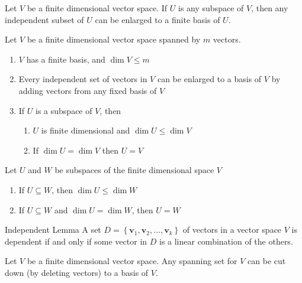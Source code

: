 \documentclass[12pt]{article}
\begin{document}
\begin{lemma}{}{}
    Let $ V $ be a finite dimensional vector space. If $ U $ is any subspace of $ V $, then any independent subset of $ U $ can be enlarged to a finite basis of $ U $.
\end{lemma}

\begin{theorem}{}{}
    Let $ V $ be a finite dimensional vector space spanned by $ m $ vectors.
    \begin{enumerate}[label=(\roman*)]
        \item $ V $ has a finite basis, and $ \dim V \leq m $
        \item Every independent set of vectors in $ V $ can be enlarged to a basis of $ V $ by adding vectors from any fixed basis of $ V $
        \item If $ U $ is a subspace of $ V $, then
        \begin{enumerate}
            \item $ U $ is finite dimensional and $ \dim U \leq \dim V $
            \item If $ \dim U = \dim V $ then $ U = V $
        \end{enumerate}
    \end{enumerate}
\end{theorem}

\begin{theorem}{}{}
    Let $ U $ and $ W $ be subspaces of the finite dimensional space $ V $
    \begin{enumerate}[label=(\roman*)]
        \item If $ U \subseteq W $, then $ \dim U \leq \dim W $
        \item If $ U \subseteq W $ and $ \dim U = \dim W $, then $ U = W $
    \end{enumerate}
\end{theorem}

\begin{lemma}{Independent Lemma}{}
    A set $ D = \left\{ \mathbf{v}_1, \mathbf{v}_2, \dots, \mathbf{v}_k \right\} $ of vectors in a vector space $ V $ is dependent if and only if some vector in $ D $ is a linear combination of the others.
\end{lemma}

\begin{theorem}{}{}
    Let $ V $ be a finite dimensional vector space. Any spanning set for $ V $ can be cut down (by deleting vectors) to a basis of $ V $.
\end{theorem}
\end{document}
